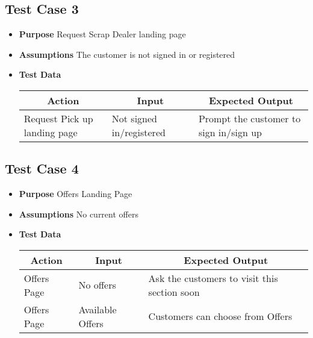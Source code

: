 \documentclass{article}
\begin{document}
\begin{itemize}
\begin{table}[h]
\begin{tabular}{|l|l|l|}
\end{tabular}
\end{table}
\end{itemize}

\subsection{Test Case 3}
\begin{itemize}
\item \textbf{Purpose}
Request Scrap Dealer landing page
\item \textbf{Assumptions}
The customer is not signed in or registered
\item \textbf{Test Data}
\begin{table}[h]
\begin{tabular}{|l|l|l|}
\hline
\multicolumn{1}{|c|}{\textbf{Action}} & \multicolumn{1}{c|}{\textbf{Input}} & \multicolumn{1}{c|}{\textbf{Expected Output}} \\ \hline
Request Pick up landing page                       & Not signed in/registered            & Prompt the customer to sign in/sign up        \\ \hline
\end{tabular}
\end{table}
\end{itemize}



\subsection{Test Case 4}
\begin{itemize}
\item \textbf{Purpose}
Offers Landing Page
\item \textbf{Assumptions}
No current offers
\item \textbf{Test Data}
\begin{table}[h]
\begin{tabular}{|l|l|l|}
\hline
\multicolumn{1}{|c|}{\textbf{Action}} & \multicolumn{1}{c|}{\textbf{Input}} & \multicolumn{1}{c|}{\textbf{Expected Output}} \\ \hline
Offers Page                           & No offers                           & Ask the customers to visit this section soon  \\ \hline
Offers Page                           & Available Offers                    & Customers can choose from Offers              \\ \hline
\end{tabular}
\end{table}
\end{itemize}
\end{document}
